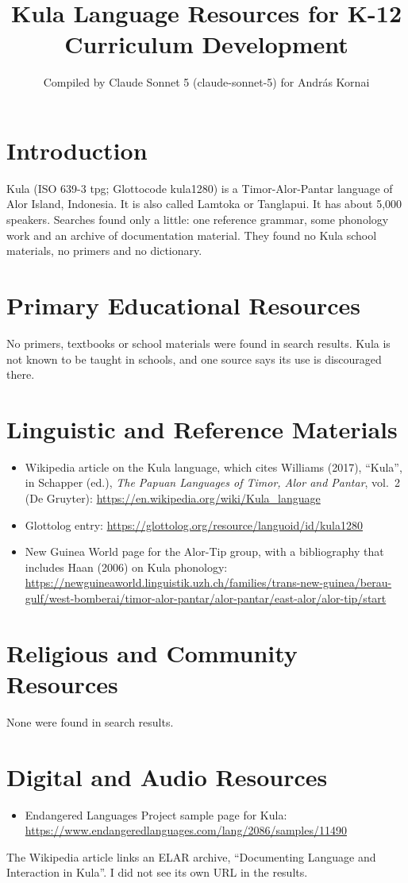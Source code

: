 \documentclass[12pt]{article}
\title{Kula Language Resources for K-12 Curriculum Development}
\author{Compiled by Claude Sonnet 5 (claude-sonnet-5) for Andr\'as Kornai}
\date{}
\begin{document}
\maketitle
\section{Introduction}
Kula (ISO 639-3 tpg; Glottocode kula1280) is a Timor-Alor-Pantar language of Alor Island, Indonesia. It is also called Lamtoka or Tanglapui. It has about 5,000 speakers. Searches found only a little: one reference grammar, some phonology work and an archive of documentation material. They found no Kula school materials, no primers and no dictionary.
\section{Primary Educational Resources}
No primers, textbooks or school materials were found in search results. Kula is not known to be taught in schools, and one source says its use is discouraged there.
\section{Linguistic and Reference Materials}
\begin{itemize}
\item Wikipedia article on the Kula language, which cites Williams (2017), ``Kula'', in Schapper (ed.), \emph{The Papuan Languages of Timor, Alor and Pantar}, vol.\ 2 (De Gruyter): \url{https://en.wikipedia.org/wiki/Kula_language}
\item Glottolog entry: \url{https://glottolog.org/resource/languoid/id/kula1280}
\item New Guinea World page for the Alor-Tip group, with a bibliography that includes Haan (2006) on Kula phonology: \url{https://newguineaworld.linguistik.uzh.ch/families/trans-new-guinea/berau-gulf/west-bomberai/timor-alor-pantar/alor-pantar/east-alor/alor-tip/start}
\end{itemize}
\section{Religious and Community Resources}
None were found in search results.
\section{Digital and Audio Resources}
\begin{itemize}
\item Endangered Languages Project sample page for Kula: \url{https://www.endangeredlanguages.com/lang/2086/samples/11490}
\end{itemize}
The Wikipedia article links an ELAR archive, ``Documenting Language and Interaction in Kula''. I did not see its own URL in the results.
\end{document}

